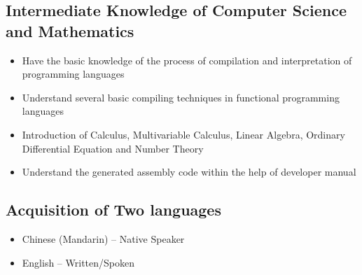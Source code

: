 \documentclass{resume}
\begin{document}
\subsection{\textbf{Intermediate Knowledge of Computer Science and Mathematics}}
\begin{itemize}
\item Have the basic knowledge of the process of compilation and interpretation of programming languages
\item Understand several basic compiling techniques in functional programming languages
\item Introduction of Calculus, Multivariable Calculus, Linear Algebra, Ordinary Differential Equation and Number Theory
\item Understand the generated assembly code within the help of developer manual
\end{itemize}
\subsection{\textbf{Acquisition of Two languages}}
\begin{itemize}
\item Chinese (Mandarin) – Native Speaker
\item English – Written/Spoken
\end{itemize}

 
\end{document}
